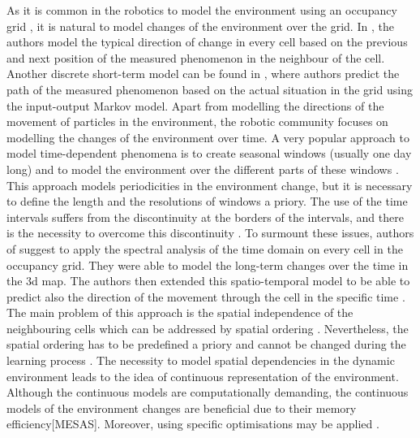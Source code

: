 As it is common in the robotics to model the environment using an occupancy grid \cite{elfes1989using}, it is natural to model changes of the environment over the grid.
In \cite{kucner2013conditional}, the authors model the typical direction of change in every cell based on the previous and next position of the measured phenomenon in the neighbour of the cell. 
Another discrete short-term model can be found in \cite{wang2014modeling}, where authors predict the path of the measured phenomenon based on the actual situation in the grid using the input-output Markov model.
Apart from modelling the directions of the movement of particles in the environment, the robotic community focuses on modelling the changes of the environment over time.
A very popular approach to model time-dependent phenomena is to create seasonal windows (usually one day long) and to model the environment over the different parts of these windows \cite{Van2008Using,Blanke2009Daily}.
This approach models periodicities in the environment change, but it is necessary to define the length and the resolutions of windows a priory.
The use of the time intervals suffers from the discontinuity at the borders of the intervals, and there is the necessity to overcome this discontinuity \cite{chinellato2017incremental}.
To surmount these issues, authors of \cite{krajnik2017fremen} suggest to apply the spectral analysis of the time domain on every cell in the occupancy grid. 
They were able to model the long-term changes over the time \cite{Krajnik2014Longterm} in the 3d map\cite{Krajnik2014Froctomap}.
The authors then extended this spatio-temporal model to be able to predict also the direction of the movement through the cell in the specific time \cite{molina2018modelling}.
The main problem of this approach is the spatial independence of the neighbouring cells which can be addressed by spatial ordering \cite{Cliff1975Model}.
Nevertheless, the spatial ordering has to be predefined a priory and cannot be changed during the learning process \cite{Shi2018Machine}.
The necessity to model spatial dependencies in the dynamic environment leads to the idea of continuous representation of the environment.
Although the continuous models are computationally demanding, the continuous models of the environment changes are beneficial due to their memory efficiency\cite{o2012gaussian}[MESAS].
Moreover, using specific optimisations may be applied \cite{ramos2016hilbert}.

